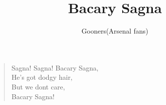 \documentclass[a4paper,12pt]{article}
\title{Bacary Sagna}
\author{Gooners(Arsenal fans)}
\date{}
\begin{document}
	
	\maketitle
	
	\begin{verse}
		
		Sagna! Sagna! Bacary Sagna, \\
		He's got dodgy hair, \\
		But we dont care, \\
		Bacary Sagna!
		
	\end{verse}
	
\end{document}
